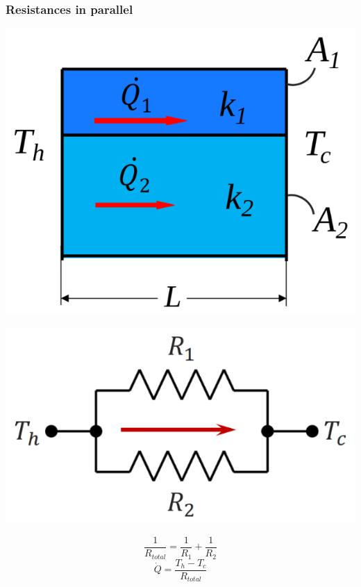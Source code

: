 \documentclass[11pt]{article}
\begin{document}
\subsubsection{Resistances in parallel}
\label{sec:orgbc9ed9a}
\begin{center}
\includegraphics[width=.9\linewidth]{./images/thermal-resistances-in-parallel.png}
\end{center}
\begin{center}
\includegraphics[width=.9\linewidth]{./images/thermal-resistances-in-parallel-electrical-analogy.png}
\end{center}
\[\frac{1}{R_{total}} = \frac{1}{R_1} + \frac{1}{R_2}\]
\[\dot{Q} = \frac{T_h - T_c}{R_{total}}\]
\end{document}
